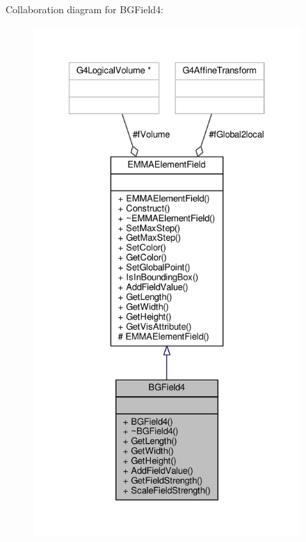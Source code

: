 Collaboration diagram for B\+G\+Field4\+:
\nopagebreak
\begin{figure}[H]
\begin{center}
\leavevmode
\includegraphics[height=550pt]{classBGField4__coll__graph}
\end{center}
\end{figure}

